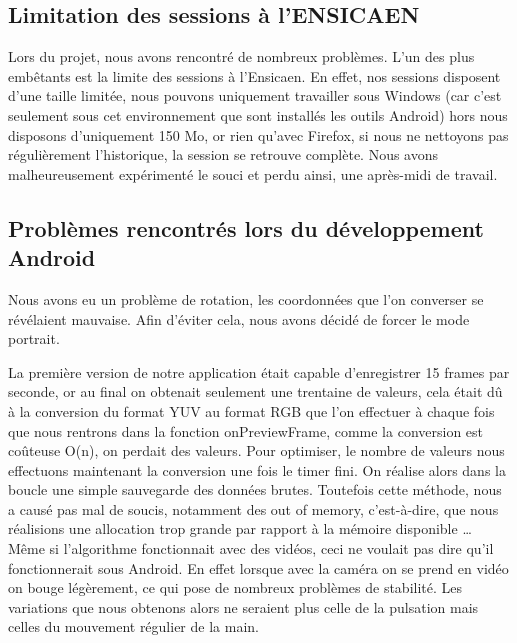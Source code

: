 \subsection{Limitation des sessions à l'ENSICAEN}

Lors du projet, nous avons rencontré de nombreux problèmes. L'un des plus embêtants est la limite des sessions à l'Ensicaen. En effet, nos sessions disposent d'une taille limitée, nous pouvons uniquement travailler sous Windows (car
c'est seulement sous cet environnement que sont installés les outils Android) hors nous disposons d'uniquement 150 Mo, or rien qu'avec Firefox, si nous ne nettoyons pas régulièrement l'historique, la session se retrouve 
complète. Nous avons malheureusement expérimenté le souci et perdu ainsi, une après-midi de travail. 

\subsection{Problèmes rencontrés lors du développement Android}

Nous avons eu un problème de rotation, les coordonnées que l'on converser se révélaient mauvaise. Afin d'éviter cela, nous avons décidé de forcer le mode portrait.

La première version de notre application était capable d'enregistrer 15 frames par seconde, or au final on obtenait seulement une trentaine de valeurs, cela était dû à la conversion du format YUV au format RGB que l'on 
effectuer à chaque fois que nous rentrons dans la fonction onPreviewFrame, comme la conversion est coûteuse O(n), on perdait des valeurs. Pour optimiser, le nombre de valeurs nous effectuons maintenant la conversion
une fois le timer fini. On réalise alors dans la boucle une simple sauvegarde des données brutes. 
Toutefois cette méthode, nous a causé pas mal de soucis, notamment des out of memory, c'est-à-dire, que nous réalisions une allocation trop grande par rapport à la mémoire disponible \ldots{}
\\
Même si l'algorithme fonctionnait avec des vidéos, ceci ne voulait pas dire qu'il fonctionnerait sous Android.
En effet lorsque avec la caméra on se prend en vidéo on bouge légèrement, ce qui pose de nombreux problèmes de stabilité. 
Les variations que nous obtenons alors ne seraient plus celle de la pulsation mais celles du mouvement régulier de la main.


